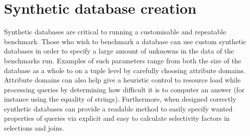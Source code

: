 \section{Synthetic database creation}\label{sec:benchmark:database}
Synthetic databases are critical to running a customisable and repeatable
benchmark. Those who wish to benchmark a database can use custom synthetic
databases in order to specify a large amount of unknowns in the data of the
benchmarks run. Examples of such parameters range from both the size of the
database as a whole to on a tuple level by carefully choosing attribute domains.
Attribute domains can also help give a heuristic control to resource load while
processing queries by determining how difficult it is to computer an answer (for
instance using the equality of strings). Furthermore, when designed correctly synthetic
databases can provide a readable method to easily specify wanted properties of
queries via explicit and easy to calculate selectivity factors in selections and
joins.
